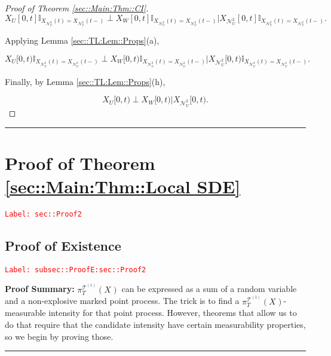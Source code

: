 \documentclass[12pt]{article}
\newcommand{\mb}{\mathbb}
\newcommand{\mc}{\mathcal}
\newcommand{\tr}{\textcolor{red}}
\newcommand{\labe}[1]{\tr{\texttt{Label: #1}}}
\newcommand{\pfsum}{\textbf{Proof Summary: }}
\newcommand{\lin}{\rule{\linewidth}{0.4 pt}}
\renewcommand{\U}{U}							%
\newcommand{\UU}{W}								%
\newcommand{\T}{T}								%
\renewcommand{\t}{t}							%
\newcommand{\proj}{\pi}							%
\newcommand{\X}{X}								%
\newcommand{\dneigh}{\mc{N}^2}					%
\newcommand{\vsi}[1]{^{#1}}						%
\newcommand{\cind}[1]{_{#1}}					%
\newcommand{\tp}[1]{(#1)}						%
\newcommand{\tip}[1]{#1}						%
\newcommand{\ts}[1]{_{#1}}						%
\newcommand{\tree}{\mc{T}}						%
\newcommand{\sln}[1]{^{(#1)}}						%
\newcommand{\dnvind}[1]{_{#1}}				%
\begin{document}
\begin{proof}[Proof of Theorem \ref{sec::Main:Thm::CI}]
\[\X\cind{\U}\tip{[0,\t]}\mb{I}_{\X\cind{\dneigh\dnvind{\U}}\tp{\t} = \X\cind{\dneigh\dnvind{\U}}\tp{\t-}}\perp\X\cind{\UU}\tip{[0,\t]}\mb{I}_{\X\cind{\dneigh\dnvind{\U}}\tp{\t} = \X\cind{\dneigh\dnvind{\U}}\tp{\t-}}\big|\X\cind{\dneigh\dnvind{\U}}\tip{[0,\t]}\mb{I}_{\X\cind{\dneigh\dnvind{\U}}\tp{\t} = \X\cind{\dneigh\dnvind{\U}}\tp{\t-}}.\]

Applying Lemma \ref{sec::TL:Lem::Props}(a),

\[\X\cind{\U}\tip{[0,\t)}\mb{I}_{\X\cind{\dneigh\dnvind{\U}}\tp{\t} = \X\cind{\dneigh\dnvind{\U}}\tp{\t-}}\perp\X\cind{\UU}\tip{[0,\t)}\mb{I}_{\X\cind{\dneigh\dnvind{\U}}\tp{\t} = \X\cind{\dneigh\dnvind{\U}}\tp{\t-}}\big|\X\cind{\dneigh\dnvind{\U}}\tip{[0,\t)}\mb{I}_{\X\cind{\dneigh\dnvind{\U}}\tp{\t} = \X\cind{\dneigh\dnvind{\U}}\tp{\t-}}.\]

Finally, by Lemma \ref{sec::TL:Lem::Props}(h),

\[\X\cind{\U}\tip{[0,\t)}\perp\X\cind{\UU}\tip{[0,\t)}\big|\X\cind{\dneigh\dnvind{\U}}\tip{[0,\t)}.\]
\end{proof}

\lin

\section{Proof of Theorem \ref{sec::Main:Thm::Local SDE}}
\label{sec::Proof2}\labe{sec::Proof2}

\subsection{Proof of Existence}
\label{subsec::ProofE:sec::Proof2}\labe{subsec::ProofE:sec::Proof2}

\pfsum \(\proj\vsi{\tree\sln{1}}\ts{\T}(\X\cind{}\tip{})\) can be expressed as a sum of a random variable and a non-explosive marked point process. The trick is to find a \(\proj\vsi{\tree\sln{1}}\ts{\T}(\X\cind{}\tip{})\)-measurable intensity for that point process. However, theorems that allow us to do that require that the candidate intensity have certain measurability properties, so we begin by proving those.

\lin
\end{document}
